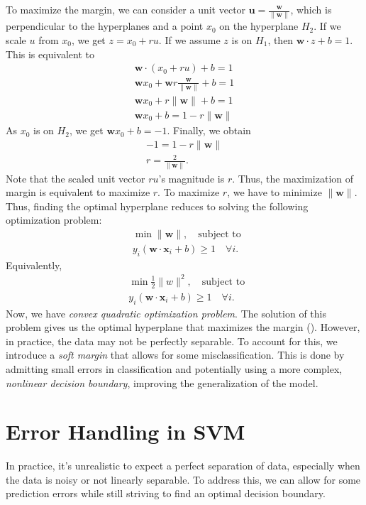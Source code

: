 To maximize the margin, we can consider a unit vector $\mathbf{u} = \frac{\mathbf{w}}{\lVert\mathbf{w}\rVert}$, which is perpendicular to the hyperplanes and a point $x_0$ on the hyperplane $H_2$. If we scale $u$ from $x_0$, we get $z = x_0+ru$. If we assume $z$ is on $H_1$, then $\mathbf{w}\cdot z +b=1$. This is equivalent to 
\begin{align*}
	\mathbf{w}\cdot (x_0+ru)+b=1\\
	\mathbf{w}x_0+\mathbf{w}r\frac{\mathbf{w}}{\lVert\mathbf{w}\rVert}+b=1\\
	\mathbf{w}x_0+r\lVert \mathbf{w}\rVert +b=1\\
	\mathbf{w}x_0+b=1-r\lVert \mathbf{w}\rVert 
\end{align*}
As $x_0$ is on $H_2$, we get $\mathbf{w}x_0+b=-1$. Finally, we obtain
\begin{align*}
	-1=1-r\lVert \mathbf{w}\rVert \\
	r=\frac{2}{\lVert \mathbf{w}\rVert }.
\end{align*}
Note that the scaled unit vector $ru$'s magnitude is $r$. Thus, the maximization of margin is equivalent to maximize $r$. To maximize $r$, we have to minimize $\lVert \mathbf{w} \rVert$. Thus, finding the optimal hyperplane reduces to solving the following optimization problem:
\begin{align*}
	&\min \lVert \mathbf{w}\rVert ,\quad \textrm{subject to } \\
	&y_i(\mathbf{w}\cdot \mathbf{x}_i+b)\geq 1 \quad\forall i.
\end{align*}
Equivalently, 
\begin{align*}
	&\min \frac{1}{2}\lVert w\rVert ^2,\quad \textrm{subject to } \\
	&y_i(\mathbf{w}\cdot \mathbf{x}_i+b)\geq 1 \quad\forall i.
\end{align*}
Now, we have \textit{convex quadratic optimization problem}. The solution of this problem gives us the optimal hyperplane that maximizes the margin (\cf {}). However, in practice, the data may not be perfectly separable. To account for this, we introduce a \textit{soft margin} that allows for some misclassification. This is done by admitting small errors in classification and potentially using a more complex, \textit{nonlinear decision boundary}, improving the generalization of the model.

\section{Error Handling in SVM}
In practice, it's unrealistic to expect a perfect separation of data, especially when the data is noisy or not linearly separable. To address this, we can allow for some prediction errors while still striving to find an optimal decision boundary.

